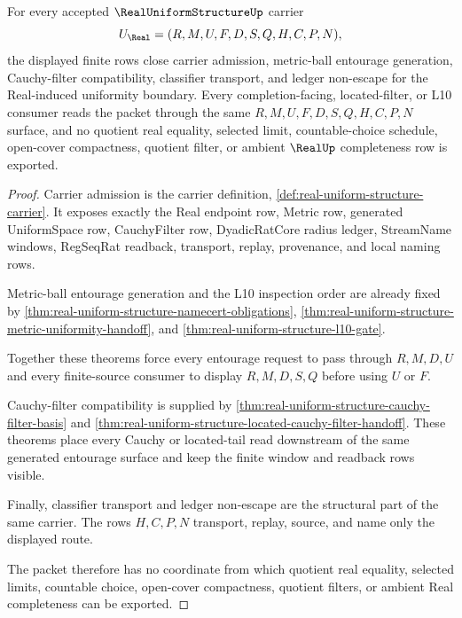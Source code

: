 \begin{theorem}
\label{thm:real-uniform-structure-obligation-closure-package}
For every accepted $\RealUniformStructureUp$ carrier
$$
U_{\Real}=(R,M,U,F,D,S,Q,H,C,P,N),
$$
the displayed finite rows close carrier admission, metric-ball entourage generation, Cauchy-filter compatibility, classifier transport, and ledger non-escape for the Real-induced uniformity boundary. Every completion-facing, located-filter, or L10 consumer reads the packet through the same $R,M,U,F,D,S,Q,H,C,P,N$ surface, and no quotient real equality, selected limit, countable-choice schedule, open-cover compactness, quotient filter, or ambient $\RealUp$ completeness row is exported.
\end{theorem}
\begin{proof}
Carrier admission is the carrier definition, \autoref{def:real-uniform-structure-carrier}. It exposes exactly the Real endpoint row, Metric row, generated UniformSpace row, CauchyFilter row, DyadicRatCore radius ledger, StreamName windows, RegSeqRat readback, transport, replay, provenance, and local naming rows.

Metric-ball entourage generation and the L10 inspection order are already fixed by \autoref{thm:real-uniform-structure-namecert-obligations}, \autoref{thm:real-uniform-structure-metric-uniformity-handoff}, and \autoref{thm:real-uniform-structure-l10-gate}.

Together these theorems force every entourage request to pass through $R,M,D,U$ and every finite-source consumer to display $R,M,D,S,Q$ before using $U$ or $F$.

Cauchy-filter compatibility is supplied by \autoref{thm:real-uniform-structure-cauchy-filter-basis} and \autoref{thm:real-uniform-structure-located-cauchy-filter-handoff}. These theorems place every Cauchy or located-tail read downstream of the same generated entourage surface and keep the finite window and readback rows visible.

Finally, classifier transport and ledger non-escape are the structural part of the same carrier. The rows $H,C,P,N$ transport, replay, source, and name only the displayed route.

The packet therefore has no coordinate from which quotient real equality, selected limits, countable choice, open-cover compactness, quotient filters, or ambient Real completeness can be exported.
\end{proof}

